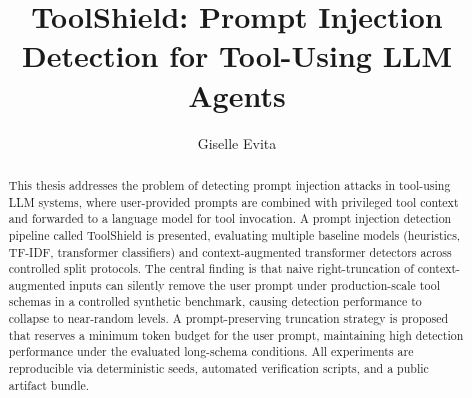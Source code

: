 \documentclass[
  english,
  accentcolor=9c,
  ruledheaders=section,
  class=report,
  thesis={type=bachelor},
  fontsize=11pt,
  parskip=half-,
  custommargins=true,
  marginpar=false,
  accept-missing-logos=true, %
]{tudapub}
\title{ToolShield: Prompt Injection Detection for Tool-Using LLM Agents}
\author{Giselle Evita}
\institute{Department of Computer Science}
\begin{document}
\maketitle

% 

\newpage
\begin{abstract}
This thesis addresses the problem of detecting prompt injection attacks in tool-using LLM systems, where user-provided prompts are combined with privileged tool context and forwarded to a language model for tool invocation. A prompt injection detection pipeline called ToolShield is presented, evaluating multiple baseline models (heuristics, TF-IDF, transformer classifiers) and context-augmented transformer detectors across controlled split protocols. The central finding is that naive right-truncation of context-augmented inputs can silently remove the user prompt under production-scale tool schemas in a controlled synthetic benchmark, causing detection performance to collapse to near-random levels. A prompt-preserving truncation strategy is proposed that reserves a minimum token budget for the user prompt, maintaining high detection performance under the evaluated long-schema conditions. All experiments are reproducible via deterministic seeds, automated verification scripts, and a public artifact bundle.
\end{abstract}

\tableofcontents










\appendix
\end{document}
